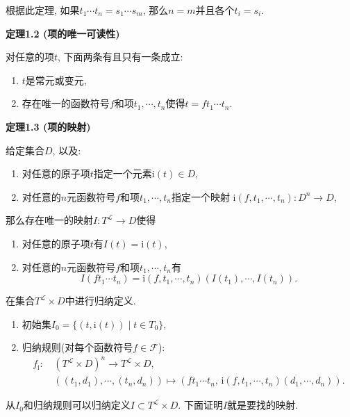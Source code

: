 \vspace{10pt}

根据此定理, 如果$t_1\cdots t_n=s_1\cdots s_m$,
那么$n=m$并且各个$t_i=s_i$.





\newpage

\hypertarget{sec:定理1.2}{}
\noindent\textbf{定理1.2 (项的唯一可读性)}

对任意的项$t$, 下面两条有且只有一条成立:
\begin{enumerate}
    \item $t$是常元或变元,
    \item 存在唯一的函数符号$f$和项$t_1,\cdots,t_n$使得$t=ft_1\cdots t_n$.
\end{enumerate}

\vspace{10pt}

\hypertarget{sec:定理1.3}{}
\noindent\textbf{定理1.3 (项的映射)}

给定集合$D$, 以及:
\begin{enumerate}
    \item 对任意的原子项$t$指定一个元素$\mathrm{i}(t)\in D$,
    \item 对任意的$n$元函数符号$f$和项$t_1,\cdots,t_n$指定一个映射
    $\mathrm{i}(f,t_1,\cdots,t_n):D^n\to D$,
\end{enumerate}
那么存在唯一的映射$I:T^{\mathcal{L}}\to D$使得
\begin{enumerate}
    \item 对任意的原子项$t$有$I(t)=\mathrm{i}(t)$,
    \item 对任意的$n$元函数符号$f$和项$t_1,\cdots,t_n$有
    \[
        I(ft_1\cdots t_n)=\mathrm{i}(f,t_1,\cdots,t_n)(I(t_1),\cdots,I(t_n)).
    \]
\end{enumerate}


在集合$T^{\mathcal{L}}\times D$中进行归纳定义.
\begin{enumerate}
    \item 初始集$I_0=\{(t,\mathrm{i}(t))\mid t\in T_0\}$,
    \item 归纳规则(对每个函数符号$f\in\mathcal{F}$):
    \[\begin{aligned}
        f_{\mathrm{i}}:\,&(T^{\mathcal{L}}\times D)^n\to T^{\mathcal{L}}\times D,\\
        &((t_1,d_1),\cdots,(t_n,d_n))
        \mapsto(ft_1\cdots t_n,\,\mathrm{i}(f,t_1,\cdots,t_n)(d_1,\cdots,d_n)).
    \end{aligned}\]
\end{enumerate}
从$I_0$和归纳规则可以归纳定义$I\subset T^{\mathcal{L}}\times D$.
下面证明$I$就是要找的映射.

